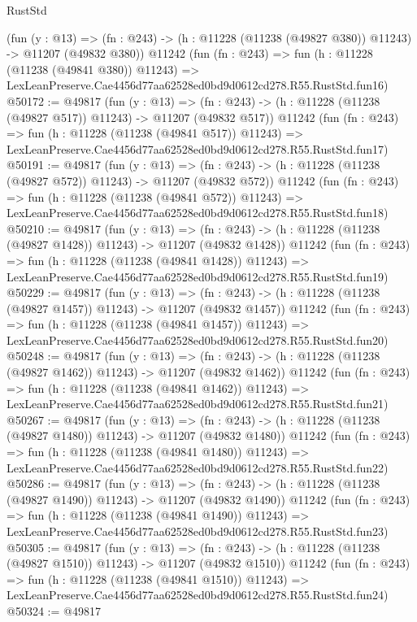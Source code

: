 \begin{lexlean}{RustStd}
\begin{coremodule}
    (fun (y : @13) =>
    (fn : @243) -> (h : @11228 (@11238 (@49827 @380)) @11243) -> @11207 (@49832 @380))
    @11242
    (fun (fn : @243) =>
    fun (h : @11228 (@11238 (@49841 @380)) @11243) =>
    LexLeanPreserve.Cae4456d77aa62528ed0bd9d0612cd278.R55.RustStd.fun16)
@50172 := @49817
    (fun (y : @13) =>
    (fn : @243) -> (h : @11228 (@11238 (@49827 @517)) @11243) -> @11207 (@49832 @517))
    @11242
    (fun (fn : @243) =>
    fun (h : @11228 (@11238 (@49841 @517)) @11243) =>
    LexLeanPreserve.Cae4456d77aa62528ed0bd9d0612cd278.R55.RustStd.fun17)
@50191 := @49817
    (fun (y : @13) =>
    (fn : @243) -> (h : @11228 (@11238 (@49827 @572)) @11243) -> @11207 (@49832 @572))
    @11242
    (fun (fn : @243) =>
    fun (h : @11228 (@11238 (@49841 @572)) @11243) =>
    LexLeanPreserve.Cae4456d77aa62528ed0bd9d0612cd278.R55.RustStd.fun18)
@50210 := @49817
    (fun (y : @13) =>
    (fn : @243) -> (h : @11228 (@11238 (@49827 @1428)) @11243) -> @11207 (@49832 @1428))
    @11242
    (fun (fn : @243) =>
    fun (h : @11228 (@11238 (@49841 @1428)) @11243) =>
    LexLeanPreserve.Cae4456d77aa62528ed0bd9d0612cd278.R55.RustStd.fun19)
@50229 := @49817
    (fun (y : @13) =>
    (fn : @243) -> (h : @11228 (@11238 (@49827 @1457)) @11243) -> @11207 (@49832 @1457))
    @11242
    (fun (fn : @243) =>
    fun (h : @11228 (@11238 (@49841 @1457)) @11243) =>
    LexLeanPreserve.Cae4456d77aa62528ed0bd9d0612cd278.R55.RustStd.fun20)
@50248 := @49817
    (fun (y : @13) =>
    (fn : @243) -> (h : @11228 (@11238 (@49827 @1462)) @11243) -> @11207 (@49832 @1462))
    @11242
    (fun (fn : @243) =>
    fun (h : @11228 (@11238 (@49841 @1462)) @11243) =>
    LexLeanPreserve.Cae4456d77aa62528ed0bd9d0612cd278.R55.RustStd.fun21)
@50267 := @49817
    (fun (y : @13) =>
    (fn : @243) -> (h : @11228 (@11238 (@49827 @1480)) @11243) -> @11207 (@49832 @1480))
    @11242
    (fun (fn : @243) =>
    fun (h : @11228 (@11238 (@49841 @1480)) @11243) =>
    LexLeanPreserve.Cae4456d77aa62528ed0bd9d0612cd278.R55.RustStd.fun22)
@50286 := @49817
    (fun (y : @13) =>
    (fn : @243) -> (h : @11228 (@11238 (@49827 @1490)) @11243) -> @11207 (@49832 @1490))
    @11242
    (fun (fn : @243) =>
    fun (h : @11228 (@11238 (@49841 @1490)) @11243) =>
    LexLeanPreserve.Cae4456d77aa62528ed0bd9d0612cd278.R55.RustStd.fun23)
@50305 := @49817
    (fun (y : @13) =>
    (fn : @243) -> (h : @11228 (@11238 (@49827 @1510)) @11243) -> @11207 (@49832 @1510))
    @11242
    (fun (fn : @243) =>
    fun (h : @11228 (@11238 (@49841 @1510)) @11243) =>
    LexLeanPreserve.Cae4456d77aa62528ed0bd9d0612cd278.R55.RustStd.fun24)
@50324 := @49817

\end{coremodule}
\end{lexlean}
